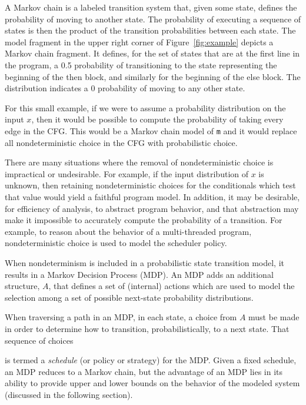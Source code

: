 A Markov chain is a labeled transition system that, given some
state, defines the probability of moving to another state.
The probability of executing a sequence of states is then the
product of the transition probabilities between each state.
The model fragment in the upper right corner of 
Figure~\ref{fig:example} depicts a Markov chain fragment.
It defines, for the set of states 
that are at the first line in the program, 
a 0.5 probability of transitioning to 
the state representing the beginning of the then block,
and similarly for the beginning of the else block.  The
distribution indicates a 0 probability of moving to any
other state.

For this small example, if we were to assume a probability
distribution on the input $x$, then it would be possible
to compute the probability of taking every edge in the CFG.   
This would be a Markov chain model of {\tt m} and it would replace
all nondeterministic choice in the CFG with probabilistic choice.

There are many situations where the removal of nondeterministic
choice is impractical or undesirable.  For example, if the input
distribution of $x$ is unknown, then retaining nondeterministic
choices for the conditionals which test that value would yield a
faithful program model.  In addition, it may be desirable, for
efficiency of analysis, to abstract program behavior, and that
abstraction may make it impossible to accurately compute the 
probability of a transition.  For example, to reason about the
behavior of a multi-threaded program, nondeterministic choice is
used to model the scheduler policy.

When nondeterminism is included in a probabilistic state
transition model, it results in a Markov Decision Process (MDP).  
An MDP adds an additional structure, $A$, that defines
a set of (internal) actions which are used to model the
selection among a set of possible next-state probability distributions.
When traversing a path in an MDP, in each state, a choice
from $A$ must be made in order to determine how to transition,
probabilistically, to a next state.   That sequence of choices
 is termed a \textit{schedule} (or policy or 
strategy) for the MDP.
Given a fixed schedule, an MDP reduces to a Markov chain, but
the advantage of an MDP lies in its ability to provide upper and
lower bounds on the behavior of the modeled system (discussed
in the following section).
